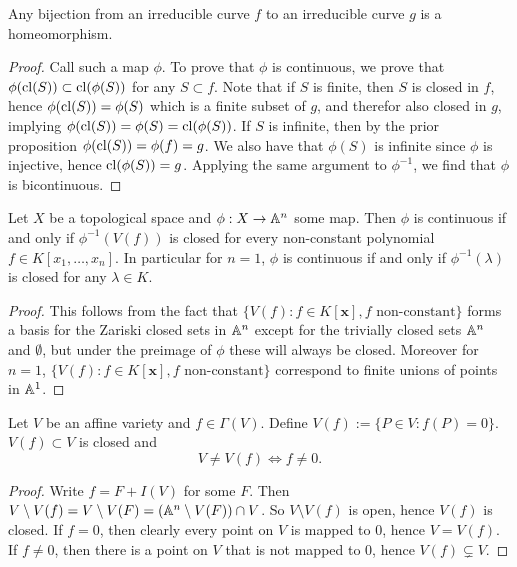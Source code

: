     \begin{proposition}
        Any bijection from an irreducible curve $f$ to an irreducible curve $g$ is a homeomorphism. 
    \end{proposition}
    \begin{proof}
        Call such a map $\phi$. To prove that $\phi$ is continuous, we prove that $\phi(\mathrm{cl}(S))\subset \mathrm{cl}(\phi(S))$ for any $S\subset f$. Note that if $S$ is finite, then $S$ is closed in $f$, hence $\phi(\mathrm{cl}(S))=\phi(S)$ which is a finite subset of $g$, and therefor also closed in $g$, implying $\phi(\mathrm{cl}(S))=\phi(S)=\mathrm{cl}(\phi(S))$. If $S$ is infinite, then by the prior proposition $\phi(\mathrm{cl}(S))=\phi(f)=g$. We also have that $\phi(S)$ is infinite since $\phi$ is injective, hence $\mathrm{cl}(\phi(S))=g$. Applying the same argument to $\phi^{-1}$, we find that $\phi$ is bicontinuous.  
    \end{proof}
    \begin{lemma}\label{TrickToCheckZariskiContinuity}
        Let $X$ be a topological space and $\phi: X\rightarrow \mathbb{A}^n$ some map. Then $\phi$ is continuous if and only if $\phi^{-1}(V(f))$ is closed for every non-constant polynomial $f\in K[x_1,\dots,x_n]$. In particular for $n=1$, $\phi$ is continuous if and only if $\phi^{-1}(\lambda)$ is closed for any $\lambda\in K$.
    \end{lemma}
    \begin{proof}
        This follows from the fact that $\{V(f): f\in K[\mathbf{x}], f \text{ non-constant}\}$ forms a basis for the Zariski closed sets in $\mathbb{A}^n$ except for the trivially closed sets $\mathbb{A}^n$ and $\emptyset$, but under the preimage of $\phi$ these will always be closed. Moreover for $n=1$, $\{V(f): f\in K[\mathbf{x}], f \text{ non-constant}\}$ correspond to finite unions of points in $\mathbb{A}^1$. 
    \end{proof}
    \begin{lemma}
        Let $V$ be an affine variety and $f\in \Gamma(V)$. Define $V(f):= \{ P\in V: f(P)=0\}$. $V(f)\subset V$ is closed and 
        $$V\neq V(f) \iff f\neq 0.$$ 
    \end{lemma}
    \begin{proof}
        Write $f = F+I(V)$ for some $F$. Then $V\setminus V(f)= V\setminus V(F) = \left(\mathbb{A}^n\setminus V(F)\right)\cap V$. So $V\setminus V(f)$ is open, hence $V(f)$ is closed. If $f =0$, then clearly every point on $V$ is mapped to $0$, hence $V=V(f)$. If $f\neq 0$, then there is a point on $V$ that is not mapped to $0$, hence $V(f)\subsetneq V$.  
    \end{proof}

